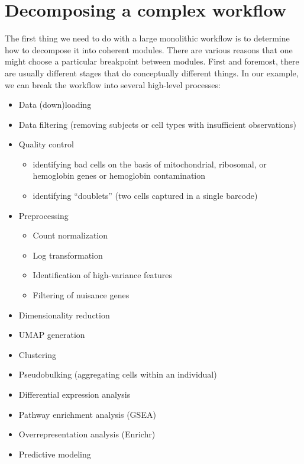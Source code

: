 \section{Decomposing a complex workflow}

The first thing we need to do with a large monolithic workflow is to determine how to decompose it into coherent modules.  There are various reasons that one might choose a particular breakpoint between modules.  First and foremost, there are usually different stages that do conceptually different things.  In our example, we can break the workflow into several high-level processes:

\begin{itemize}
\item Data (down)loading
\item Data filtering (removing subjects or cell types with insufficient observations)
\item Quality control

\begin{itemize}
\item identifying bad cells on the basis of mitochondrial, ribosomal, or hemoglobin genes or hemoglobin contamination
\item identifying ``doublets'' (two cells captured in a single barcode)
\end{itemize}

\item Preprocessing

\begin{itemize}
\item Count normalization
\item Log transformation
\item Identification of high-variance features
\item Filtering of nuisance genes
\end{itemize}

\item Dimensionality reduction
\item UMAP generation
\item Clustering
\item Pseudobulking (aggregating cells within an individual)
\item Differential expression analysis
\item Pathway enrichment analysis (GSEA)
\item Overrepresentation analysis (Enrichr)
\item Predictive modeling
\end{itemize}

